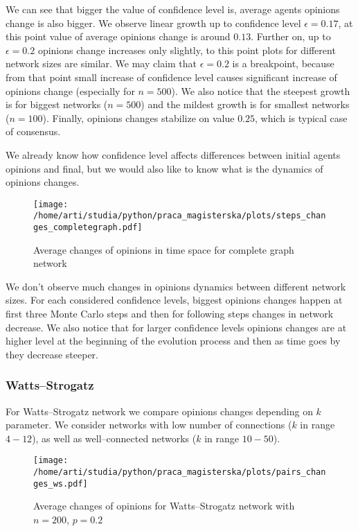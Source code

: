 \documentclass{article}
\begin{document}
We can see that bigger the value of confidence level is, average agents opinions change is also bigger. We observe linear growth up to confidence level $\epsilon=0.17$, at this point value of average opinions change is around $0.13$. Further on, up to $\epsilon=0.2$ opinions change increases only slightly, to this point plots for different network sizes are similar. We may claim that $\epsilon=0.2$ is a breakpoint, because from that point small increase of confidence level causes significant increase of opinions change (especially for $n=500$). We also notice that the steepest growth is for biggest networks ($n=500$) and the mildest growth is for smallest networks ($n=100$). Finally, opinions changes stabilize on value $0.25$, which is typical case of consensus.

\indent

We already know how confidence level affects differences between initial agents opinions and final, but we would also like to know what is the dynamics of opinions changes.

\begin{figure}[H]
		\centering
		\texttt{[image: /home/arti/studia/python/praca\_magisterska/plots/steps\_changes\_completegraph.pdf]}
		\caption{Average changes of opinions in time space for complete graph network}
\end{figure}

We don't observe much changes in opinions dynamics between different network sizes. For each considered confidence levels, biggest opinions changes happen at first three Monte Carlo steps and then for following steps changes in network decrease. We also notice that for larger confidence levels opinions changes are at higher level at the beginning of the evolution process and then as time goes by they decrease steeper.

\subsubsection{Watts--Strogatz}

For Watts--Strogatz network we compare opinions changes depending on $k$ parameter. We consider networks with low number of connections ($k$ in range $4-12$), as well as well--connected networks ($k$ in range $10-50$).

\begin{figure}[H]
		\centering
		\texttt{[image: /home/arti/studia/python/praca\_magisterska/plots/pairs\_changes\_ws.pdf]}
		\caption{Average changes of opinions for Watts--Strogatz network with $n=200$, $p=0.2$}
\end{figure}
\end{document}
